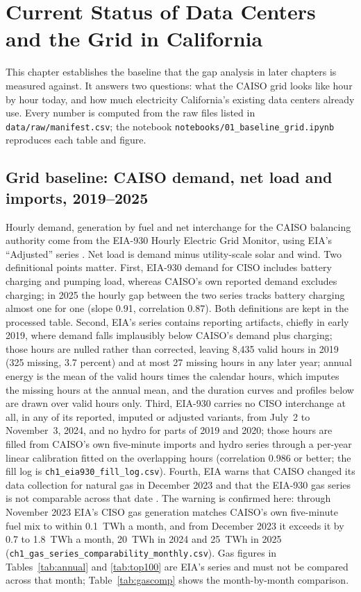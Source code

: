 \chapter{Current Status of Data Centers and the Grid in California}
\label{ch:current}

This chapter establishes the baseline that the gap analysis in later chapters is measured against. It answers two questions: what the CAISO grid looks like hour by hour today, and how much electricity California's existing data centers already use. Every number is computed from the raw files listed in \texttt{data/raw/manifest.csv}; the notebook \texttt{notebooks/01\_baseline\_grid.ipynb} reproduces each table and figure.

\section{Grid baseline: CAISO demand, net load and imports, 2019--2025}
\label{sec:baseline}

Hourly demand, generation by fuel and net interchange for the CAISO balancing authority come from the EIA-930 Hourly Electric Grid Monitor, using EIA's ``Adjusted'' series \citep{eia930}. Net load is demand minus utility-scale solar and wind. Two definitional points matter. First, EIA-930 demand for CISO includes battery charging and pumping load, whereas CAISO's own reported demand excludes charging; in 2025 the hourly gap between the two series tracks battery charging almost one for one (slope 0.91, correlation 0.87). Both definitions are kept in the processed table. Second, EIA's series contains reporting artifacts, chiefly in early 2019, where demand falls implausibly below CAISO's demand plus charging; those hours are nulled rather than corrected, leaving 8,435 valid hours in 2019 (325 missing, 3.7 percent) and at most 27 missing hours in any later year; annual energy is the mean of the valid hours times the calendar hours, which imputes the missing hours at the annual mean, and the duration curves and profiles below are drawn over valid hours only. Third, EIA-930 carries no CISO interchange at all, in any of its reported, imputed or adjusted variants, from July~2 to November~3, 2024, and no hydro for parts of 2019 and 2020; those hours are filled from CAISO's own five-minute imports and hydro series through a per-year linear calibration fitted on the overlapping hours (correlation 0.986 or better; the fill log is \texttt{ch1\_eia930\_fill\_log.csv}). Fourth, EIA warns that CAISO changed its data collection for natural gas in December 2023 and that the EIA-930 gas series is not comparable across that date \citep{eia_caiso_gas2025}. The warning is confirmed here: through November 2023 EIA's CISO gas generation matches CAISO's own five-minute fuel mix to within 0.1~TWh a month, and from December 2023 it exceeds it by 0.7 to 1.8~TWh a month, 20~TWh in 2024 and 25~TWh in 2025 (\texttt{ch1\_gas\_series\_comparability\_monthly.csv}). Gas figures in Tables~\ref{tab:annual} and \ref{tab:top100} are EIA's series and must not be compared across that month; Table~\ref{tab:gascomp} shows the month-by-month comparison.

